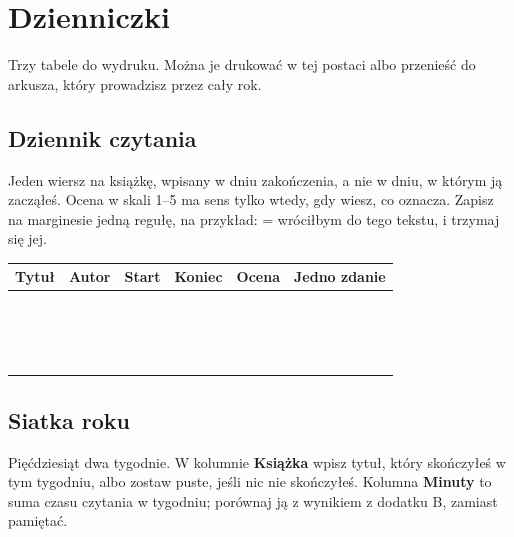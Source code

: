\chapter{Dzienniczki}

Trzy tabele do wydruku. Można je drukować w tej postaci albo przenieść do arkusza, który
prowadzisz przez cały rok.

\section{Dziennik czytania}
Jeden wiersz na książkę, wpisany w dniu zakończenia, a nie w dniu, w którym ją zacząłeś. Ocena
w skali 1--5 ma sens tylko wtedy, gdy wiesz, co oznacza. Zapisz na marginesie jedną regułę, na
przykład:  = wróciłbym do tego tekstu\grqq{}, i trzymaj się jej.

{\renewcommand{\arraystretch}{2.1}\small
\begin{longtable}{@{}p{3.3cm}p{2.5cm}p{1.6cm}p{1.6cm}p{1.2cm}p{3.5cm}@{}}
\toprule
\textsf{\textbf{Tytuł}} & \textsf{\textbf{Autor}} & \textsf{\textbf{Start}} & \textsf{\textbf{Koniec}} & \textsf{\textbf{Ocena}} & \textsf{\textbf{Jedno zdanie}}\\
\midrule
\endhead
\bottomrule
\endfoot
& & & & & \\
& & & & & \\
& & & & & \\
& & & & & \\
& & & & & \\
& & & & & \\
& & & & & \\
& & & & & \\
& & & & & \\
& & & & & \\
& & & & & \\
& & & & & \\
& & & & & \\
& & & & & \\
& & & & & \\
& & & & & \\
\end{longtable}
}

\section{Siatka roku}
Pięćdziesiąt dwa tygodnie. W kolumnie \textbf{Książka} wpisz tytuł, który skończyłeś w tym
tygodniu, albo zostaw puste, jeśli nic nie skończyłeś. Kolumna \textbf{Minuty} to suma czasu
czytania w tygodniu; porównaj ją z wynikiem z dodatku B, zamiast pamiętać.

